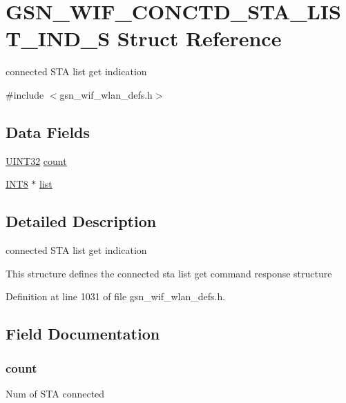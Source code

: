 \hypertarget{a00321}{
\section{GSN\_\-WIF\_\-CONCTD\_\-STA\_\-LIST\_\-IND\_\-S Struct Reference}
\label{a00321}
}


connected STA list get indication  




{\ttfamily \#include $<$gsn\_\-wif\_\-wlan\_\-defs.h$>$}

\subsection*{Data Fields}
\begin{DoxyCompactItemize}
\item 
\hyperlink{a00660_gae1e6edbbc26d6fbc71a90190d0266018}{UINT32} \hyperlink{a00321_a65cba5cc1a46504f462c0ad312079485}{count}
\item 
\hyperlink{a00660_ga307b8734c020247f6bac4fcde0dcfbb9}{INT8} $\ast$ \hyperlink{a00321_ae526dc03ee9462e20c6525368974e046}{list}
\end{DoxyCompactItemize}


\subsection{Detailed Description}
connected STA list get indication 

This structure defines the connected sta list get command response structure 

Definition at line 1031 of file gsn\_\-wif\_\-wlan\_\-defs.h.



\subsection{Field Documentation}
\hypertarget{a00321_a65cba5cc1a46504f462c0ad312079485}{
\subsubsection[{count}]{ {\bf count}}}
\label{a00321_a65cba5cc1a46504f462c0ad312079485}
Num of STA connected 

